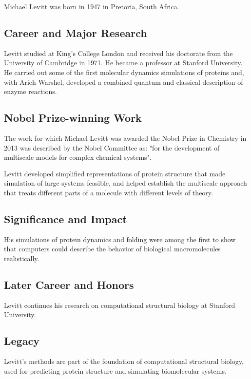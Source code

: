 Michael Levitt was born in 1947 in Pretoria, South Africa.

\subsection*{Career and Major Research}

Levitt studied at King's College London and received his doctorate from the University of Cambridge in 1971. He became a professor at Stanford University. He carried out some of the first molecular dynamics simulations of proteins and, with Arieh Warshel, developed a combined quantum and classical description of enzyme reactions.

\subsection*{Nobel Prize-winning Work}

The work for which Michael Levitt was awarded the Nobel Prize in Chemistry in 2013 was described by the Nobel Committee as: "for the development of multiscale models for complex chemical systems".

Levitt developed simplified representations of protein structure that made simulation of large systems feasible, and helped establish the multiscale approach that treats different parts of a molecule with different levels of theory.

\subsection*{Significance and Impact}

His simulations of protein dynamics and folding were among the first to show that computers could describe the behavior of biological macromolecules realistically.

\subsection*{Later Career and Honors}

Levitt continues his research on computational structural biology at Stanford University.

\subsection*{Legacy}

Levitt's methods are part of the foundation of computational structural biology, used for predicting protein structure and simulating biomolecular systems.

